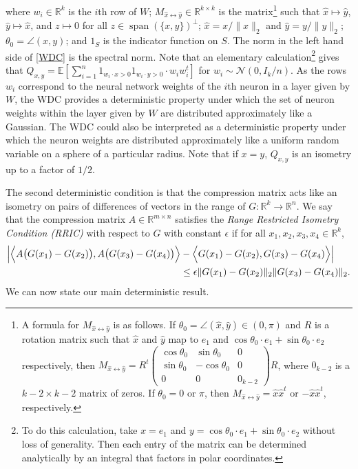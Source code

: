 \documentclass[final,12pt]{colt2018}
\newcommand{\R}{\mathbb{R}}
\newcommand{\eps}{\epsilon}
\newcommand{\indwx}{1_{w_i \cdot x > 0}}
\newcommand{\indwy}{1_{w_i \cdot y > 0}}
\newcommand{\E}{\mathbb{E}}
\newcommand{\Mxyhat}{M_{\hat{x} \leftrightarrow \hat{y}}}
\newcommand{\xhat}{\hat{x}}
\newcommand{\yhat}{\hat{y}}
\newcommand{\Qxy}{Q_{x,y}}
\DeclareMathOperator{\Span}{span}
\begin{document}
where $w_i \in \R^k$ is the $i$th row of $W$; $\Mxyhat \in \R^{k \times k}$ is the matrix\footnote{A formula for $\Mxyhat$ is as follows.  If $\theta_0 = \angle(\xhat, \yhat) \in (0, \pi)$ and $R$ is a rotation matrix such that $\xhat$ and $\yhat$ map to $e_1$ and $\cos \theta_0 \cdot e_1 + \sin \theta_0 \cdot e_2$ respectively, then $\Mxyhat = R^t \begin{pmatrix} \cos \theta_0 & \sin \theta_0 & 0 \\ \sin \theta_0 & - \cos \theta_0 & 0 \\ 0 & 0 & 0_{k-2} \end{pmatrix} R$, where $0_{k-2}$ is a $k-2 \times k-2$ matrix of zeros.  If $\theta_0 = 0$ or $\pi$, then $\Mxyhat = \xhat \xhat^t$ or $- \xhat \xhat^t$, respectively.} such that $\xhat \mapsto \yhat$, $\yhat \mapsto \xhat$, and $z \mapsto 0$ for all $z \in \Span(\{x,y\})^\perp$;  $\xhat = x/\|x\|_2$  and $\yhat = y /\|y\|_2$;  $\theta_0 = \angle(x, y)$; and $1_S$ is the indicator function on $S$.  The norm in the left hand side of \eqref{WDC} is the spectral norm.  Note that an elementary calculation\footnote{To do this calculation, take $x=e_1$ and $y = \cos \theta_0\cdot e_1 + \sin \theta_0 \cdot e_2$ without loss of generality.  Then each entry of the matrix can be determined analytically by an integral that factors in polar coordinates.} gives that $\Qxy = \E[\sum_{i=1}^n \indwx \indwy \cdot w_i w_i^t ]$ for $w_i \sim \mathcal{N}(0, I_k/n)$.  As the rows $w_i$ correspond to the neural network weights of the $i$th neuron in a layer given by $W$, the WDC provides a deterministic property under which the set of neuron weights within the layer given by $W$ are distributed approximately like a Gaussian.  The WDC could also be interpreted as a deterministic property under which the  neuron weights are distributed approximately like a uniform random variable on a sphere of a particular radius.  Note that if $x=y$, $\Qxy$ is an isometry up to a factor of $1/2$.

The second deterministic condition is that the compression matrix acts like an isometry on pairs of differences of vectors in the range of $G: \R^k \to \R^n$. We say that the compression matrix $A \in \R^{m \times n}$ satisfies the \textit{Range Restricted Isometry Condition (RRIC)} with respect to $G$ with constant $\eps$ if for all $x_1, x_2, x_3, x_4 \in \R^k$,
\begin{align}
\Bigl| \Bigl \langle A \bigl( G(x_1) - G(x_2) \bigr), A \bigl( G(x_3) - G(x_4) \bigr) \Bigr\rangle  &- \Bigl \langle  G(x_1) - G(x_2) ,  G(x_3) - G(x_4)  \Bigr \rangle \Bigr| \notag \\&\leq \eps \| G(x_1) - G(x_2) \|_2  \| G(x_3) - G(x_4) \|_2.
\end{align}
We can now state our main deterministic result.
\end{document}
